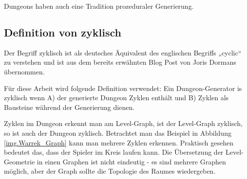 
Dungeons haben auch eine Tradition prozeduraler Generierung. 







\subsection{Definition von zyklisch}\label{c.weitereskapitel}

Der Begriff zyklisch ist als deutsches Äquivalent des englischen Begriffs „cyclic“ zu verstehen und ist aus dem bereits erwähnten Blog Post von Joris Dormans \cite{blogCyclic} übernommen. 

Für diese Arbeit wird folgende Definition verwendet: Ein Dungeon-Generator is zyklisch wenn A) der generierte Dungeon Zyklen enthält und B) Zyklen als Bausteine während der Generierung dienen.


Zyklen im Dungeon erkennt man am Level-Graph, ist der Level-Graph zyklisch, so ist auch der Dungeon zyklisch. Betrachtet man das Beispiel in Abbildung \ref{img.Warrek_Graph} kann man mehrere Zyklen erkennen. Praktisch gesehen bedeutet das, dass der Spieler im Kreis laufen kann. Die Übersetzung der Level-Geometrie in einen Graphen ist nicht eindeutig - es sind mehrere Graphen möglich, aber der Graph sollte die Topologie des Raumes wiedergeben. 

